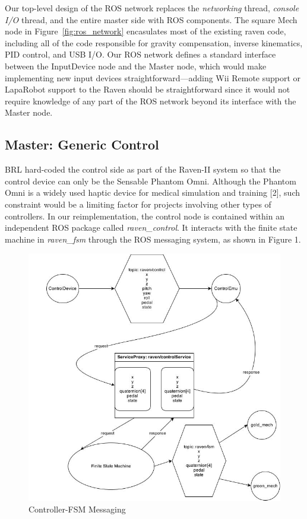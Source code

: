 \documentclass[letterpaper,twocolumn,10pt]{article}
\begin{document}
Our top-level design of the ROS network replaces the \emph{networking}
thread, \emph{console I/O} thread, and the entire master side with ROS
components. The square Mech node in Figure~\ref{fig:ros_network}
encasulates most of the existing raven code, including all of the code
responsible for gravity compensation, inverse kinematics, PID control,
and USB I/O. Our ROS network defines a standard interface between the
InputDevice node and the Master node, which would make implementing
new input devices straightforward---adding Wii Remote support or
LapaRobot support to the Raven should be straightforward since it
would not require knowledge of any part of the ROS network beyond its
interface with the Master node.

\subsection{Master: Generic Control}

BRL hard-coded the control side as part of the Raven-II system so that
the control device can only be the Sensable Phantom Omni. Although the
Phantom Omni is a widely used haptic device for medical simulation and
training [2], such constraint would be a limiting factor for projects
involving other types of controllers. In our reimplementation, the
control node is contained within an independent ROS package called
{\it raven\_control}. It interacts with the finite state machine in
{\it raven\_fsm} through the ROS messaging system, as shown in Figure
1.

\begin{figure}[h]
\includegraphics[scale=0.33]{ControlDiagram.jpg}
\caption{Controller-FSM Messaging}
\end{figure}
\end{document}
